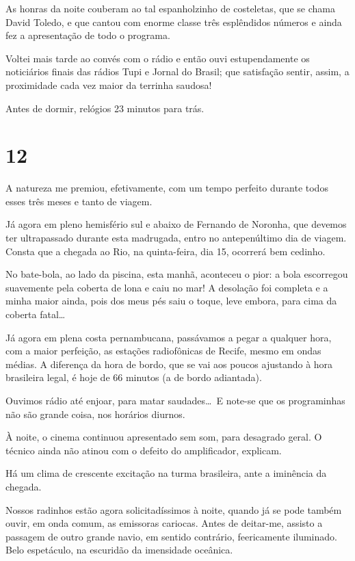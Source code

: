As honras da noite couberam ao tal espanholzinho de costeletas, que se chama David Toledo, e que cantou com enorme classe três esplêndidos números e ainda fez a apresentação de todo o programa.

Voltei mais tarde ao convés com o rádio e então ouvi estupendamente os noticiários finais das rádios Tupi e Jornal do Brasil; que satisfação sentir, assim, a proximidade cada vez maior da terrinha saudosa!

Antes de dormir, relógios 23 minutos para trás.

\section*{12 \adfflatleafright {}}
A natureza me premiou, efetivamente, com um tempo perfeito durante todos esses três meses e tanto de viagem.

Já agora em pleno hemisfério sul e abaixo de Fernando de Noronha, que devemos ter ultrapassado durante esta madrugada, entro no antepenúltimo dia de viagem. Consta que a chegada ao Rio, na quinta-feira, dia 15, ocorrerá bem cedinho.

No bate-bola, ao lado da piscina, esta manhã, aconteceu o pior: a bola escorregou suavemente pela coberta de lona e caiu no mar! A desolação foi completa e a minha maior ainda, pois dos meus pés saiu o toque, leve embora, para cima da coberta fatal\ldots

Já agora em plena costa pernambucana, passávamos a pegar a qualquer hora, com a maior perfeição, as estações radiofônicas de Recife, mesmo em ondas médias. A diferença da hora de bordo, que se vai aos poucos ajustando à hora brasileira legal, é hoje de 66 minutos (a de bordo adiantada).

Ouvimos rádio até enjoar, para matar saudades\ldots\ E note-se que os programinhas não são grande coisa, nos horários diurnos.

À noite, o cinema continuou apresentado sem som, para desagrado geral. O técnico ainda não atinou com o defeito do amplificador, explicam.

Há um clima de crescente excitação na turma brasileira, ante a iminência da chegada.

Nossos radinhos estão agora solicitadíssimos à noite, quando já se pode também ouvir, em onda comum, as emissoras cariocas. Antes de deitar-me, assisto a passagem de outro grande navio, em sentido contrário, feericamente iluminado. Belo espetáculo, na escuridão da imensidade oceânica.

